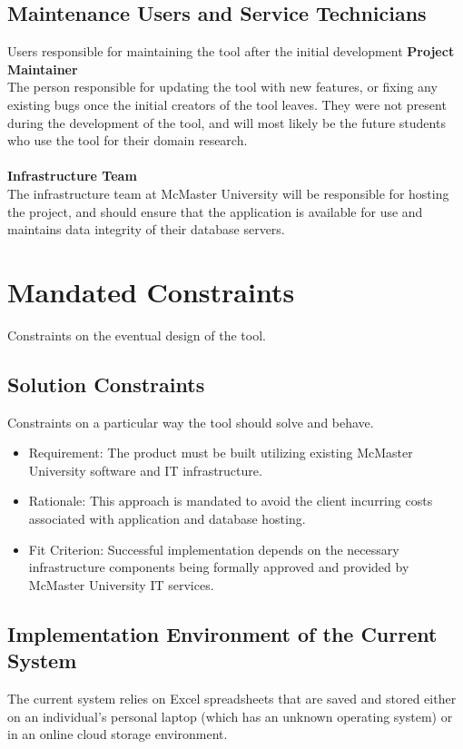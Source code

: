 \documentclass[12pt]{article}
\begin{document}
\subsection{Maintenance Users and Service Technicians}
Users responsible for maintaining the tool after the initial development
\textbf{Project Maintainer} \\
The person responsible for updating the tool with new features, or fixing any existing bugs once the initial creators of the tool leaves. They were not present during the development of the tool, and will most likely be the future students who use the tool for their domain research.
\\\\
\textbf{Infrastructure Team} \\
The infrastructure team at McMaster University will be responsible for hosting the project, and should ensure that the application is available for use and maintains data integrity of their database servers.
\section{Mandated Constraints}
Constraints on the eventual design of the tool.
\subsection{Solution Constraints}
Constraints on a particular way the tool should solve and behave.
\begin{itemize}
  \item Requirement: The product must be built utilizing existing McMaster University software and IT infrastructure.
  \item Rationale: This approach is mandated to avoid the client incurring costs associated with application and database hosting.
  \item Fit Criterion: Successful implementation depends on the necessary infrastructure components being formally approved and provided by McMaster University IT services.
\end{itemize}
\subsection{Implementation Environment of the Current System}
The current system relies on Excel spreadsheets that are saved and stored either on an individual's personal laptop (which has an unknown operating system) or in an online cloud storage environment.
\end{document}
